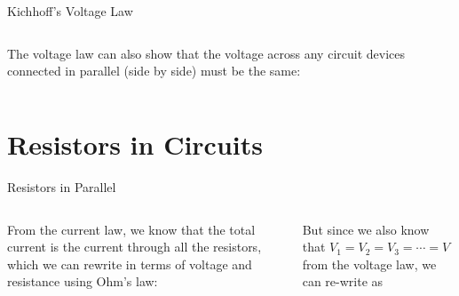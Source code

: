 \documentclass[12pt,aspectratio=169]{beamer}
\begin{document}
\begin{frame}{Kichhoff's Voltage Law}
  \begin{columns}
    \centering
    
    The voltage law can also show that the voltage across any circuit devices
    connected in parallel (side by side) must be the same:
    
%
%
  \end{columns}
\end{frame}



\section{Resistors in Circuits}

\begin{frame}{Resistors in Parallel}
  \begin{columns}
    
    From the current law, we know that the total current is the
    current through all the resistors, which we can rewrite in terms of voltage
    and resistance using Ohm's law:

    
    But since we also know that $V_1=V_2=V_3=\cdots=V$ from the voltage law, we
    can re-write as

  \end{columns}
\end{frame}
\end{document}
